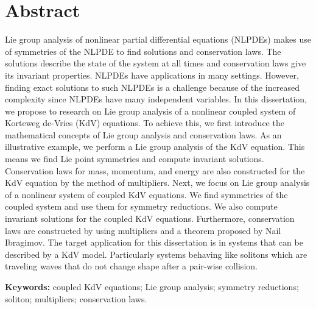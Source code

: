 \chapter*{Abstract} 
Lie group analysis of nonlinear partial differential equations (NLPDEs) makes use of symmetries of the NLPDE to find solutions and conservation laws.  The solutions describe the state of the system at all times and conservation laws give its invariant properties. NLPDEs have applications in many settings. However, finding exact solutions to such NLPDEs is a challenge because of the increased complexity since NLPDEs have many independent variables. In this dissertation, we propose to research on  Lie group analysis of a  nonlinear coupled system of Korteweg de-Vries (KdV) equations. To achieve this, we first introduce the mathematical concepts of Lie group analysis and conservation laws. As an illustrative example, we perform a Lie group analysis of the KdV equation. This means we find Lie point symmetries and compute invariant solutions. Conservation laws for mass, momentum, and energy are also constructed for the KdV equation by the method of multipliers. Next, we focus on Lie group analysis of a nonlinear system of coupled KdV equations. We find symmetries of the coupled system and use them for symmetry reductions. We also compute invariant solutions for the coupled KdV equations. Furthermore, conservation laws are constructed by using multipliers and a theorem proposed by Nail Ibragimov. The target application for this dissertation is in systems that can be described by a KdV model. Particularly systems behaving like solitons which are traveling waves that do not change shape after a pair-wise collision.


\textbf{Keywords:} coupled KdV equations; Lie group analysis; symmetry reductions; soliton; multipliers; \newline conservation laws.  



